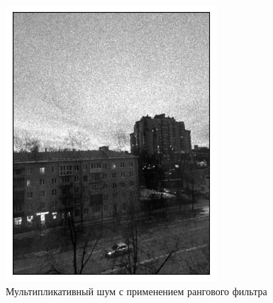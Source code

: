 \documentclass[a4paper,12pt]{article}
\begin{document}
\begin{figure}[H]
\begin{minipage}{0.49\textwidth}
        \centering \includegraphics[width=\textwidth]{results/nlf_speckle_4.png}
        \caption{Мультипликативный шум с применением рангового фильтра}
    \end{minipage}
\end{figure}
\end{document}
